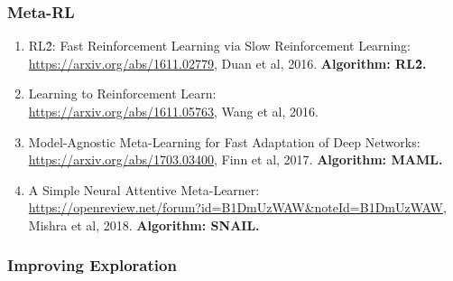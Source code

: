\documentclass[lang=cn,11pt,a4paper]{elegant_template}
\begin{document}
\subsubsection{Meta-RL}
\begin{enumerate}
    \item RL\^2: Fast Reinforcement Learning via Slow Reinforcement Learning:\\ \href{https://arxiv.org/abs/1611.02779}{https://arxiv.org/abs/1611.02779}, Duan et al, 2016. \textbf{Algorithm: RL\^2.}
    \item Learning to Reinforcement Learn:\\ \href{https://arxiv.org/abs/1611.05763}{https://arxiv.org/abs/1611.05763}, Wang et al, 2016.
    \item Model-Agnostic Meta-Learning for Fast Adaptation of Deep Networks:\\ \href{https://arxiv.org/abs/1703.03400}{https://arxiv.org/abs/1703.03400}, Finn et al, 2017. \textbf{Algorithm: MAML.}
    \item A Simple Neural Attentive Meta-Learner:\\ \href{https://openreview.net/forum?id=B1DmUzWAW&noteId=B1DmUzWAW}{https://openreview.net/forum?id=B1DmUzWAW\&noteId=B1DmUzWAW}, Mishra et al, 2018. \textbf{Algorithm: SNAIL.}
\end{enumerate}

\subsubsection{Improving Exploration}
\end{document}
